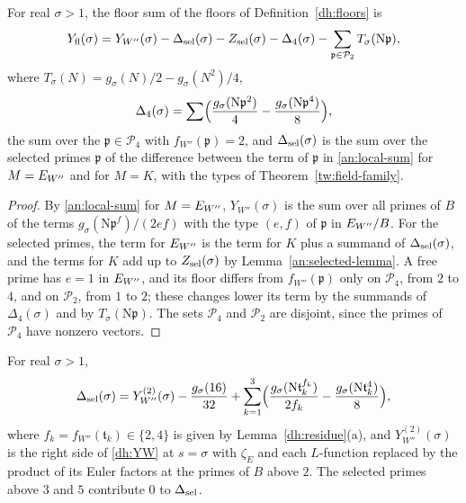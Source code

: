 \begin{lemma}\label{dh:floor-sum}
For real $\sigma>1$, the floor sum of the floors of
Definition~\ref{dh:floors} is
\[
 Y_{\rm fl}(\sigma)=Y_{W''}(\sigma)-\Delta_{\rm sel}(\sigma)-Z_{\rm sel}(\sigma)
 -\Delta_4(\sigma)-\sum_{\mathfrak p\in\mathcal P_2}T_\sigma(\mathrm N\mathfrak p),
\]
where $T_\sigma(N)=g_\sigma(N)/2-g_\sigma(N^2)/4$,
\[
 \Delta_4(\sigma)=\sum\Bigl(\frac{g_\sigma(\mathrm N\mathfrak p^2)}4
 -\frac{g_\sigma(\mathrm N\mathfrak p^4)}8\Bigr),
\]
the sum over the $\mathfrak p\in\mathcal P_4$ with $f_{W''}(\mathfrak p)=2$,
and $\Delta_{\rm sel}(\sigma)$ is the sum over the selected primes
$\mathfrak p$ of the difference between the term of $\mathfrak p$ in
\eqref{an:local-sum} for $M=E_{W''}$ and for $M=K$, with the types of
Theorem~\ref{tw:field-family}.
\end{lemma}

\begin{proof}
By \eqref{an:local-sum} for $M=E_{W''}$, $Y_{W''}(\sigma)$ is the sum over all
primes of $B$ of the terms $g_\sigma(\mathrm N\mathfrak p^f)/(2ef)$ with the
type $(e,f)$ of $\mathfrak p$ in $E_{W''}/B$. For the selected primes, the term
for $E_{W''}$ is the term for $K$ plus a summand of $\Delta_{\rm sel}(\sigma)$, and
the terms for $K$ add up to $Z_{\rm sel}(\sigma)$ by
Lemma~\ref{an:selected-lemma}. A free prime has $e=1$ in $E_{W''}$, and its
floor differs from $f_{W''}(\mathfrak p)$ only on $\mathcal P_4$, from $2$ to
$4$, and on $\mathcal P_2$, from $1$ to $2$; these changes lower its term by the
summands of $\Delta_4(\sigma)$ and by $T_\sigma(\mathrm N\mathfrak p)$. The
sets $\mathcal P_4$ and $\mathcal P_2$ are disjoint, since the primes of
$\mathcal P_4$ have nonzero vectors.
\end{proof}

\begin{lemma}\label{dh:delta-sel}
For real $\sigma>1$,
\[
 \Delta_{\rm sel}(\sigma)=Y^{(2)}_{W''}(\sigma)-\frac{g_\sigma(16)}{32}
 +\sum_{k=1}^3\Bigl(\frac{g_\sigma(\mathrm N\mathfrak t_k^{f_k})}{2f_k}
 -\frac{g_\sigma(\mathrm N\mathfrak t_k^4)}8\Bigr),
\]
where $f_k=f_{W''}(\mathfrak t_k)\in\{2,4\}$ is given by
Lemma~\ref{dh:residue}(a), and $Y^{(2)}_{W''}(\sigma)$ is the right side of
\eqref{dh:YW} at $s=\sigma$ with $\zeta_E$ and each $L$-function replaced by
the product of its Euler factors at the primes of $B$ above $2$. The
selected primes above $3$ and $5$ contribute $0$ to $\Delta_{\rm sel}$.
\end{lemma}

